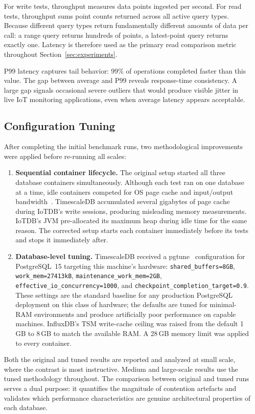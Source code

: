 For write tests, throughput measures data points ingested per second. For read tests,
throughput sums point counts returned across all active query types. Because different query
types return fundamentally different amounts of data per call: a range query returns
hundreds of points, a latest-point query returns exactly one. Latency is therefore
used as the primary read comparison metric throughout Section~\ref{sec:experiments}.

P99 latency captures tail behavior: 99\% of operations completed faster than this value.
The gap between average and P99 reveals response-time consistency. A large gap signals
occasional severe outliers that would produce visible jitter in live IoT monitoring applications,
even when average latency appears acceptable.

\subsection{Configuration Tuning}
\label{sec:tuning}

After completing the initial benchmark runs, two methodological improvements were applied
before re-running all scales:

\begin{enumerate}
  \item \textbf{Sequential container lifecycle.} The original setup started all three
    database containers simultaneously. Although each test ran on one database at a time, idle
    containers competed for OS page cache and input/output bandwidth~\citep{shapira2016pitfalls}. TimescaleDB accumulated several
    gigabytes of page cache during IoTDB's write sessions, producing misleading memory
    measurements. IoTDB's JVM pre-allocated its maximum heap during idle time for the same reason.
    The corrected setup starts each container immediately before its tests and stops it
    immediately after.

  \item \textbf{Database-level tuning.} TimescaleDB received a pgtune~\citep{pgtune}
    configuration for PostgreSQL~15 targeting this machine's hardware:
    \texttt{shared\_buffers=8GB}, \texttt{work\_mem=27413kB},
    \texttt{maintenance\_work\_mem=2GB}, \texttt{effective\_io\_concurrency=1000}, and
    \texttt{checkpoint\_completion\_target=0.9}. These settings are the standard baseline for
    any production PostgreSQL deployment on this class of hardware; the defaults are tuned
    for minimal-RAM environments and produce artificially poor performance on capable machines.
    InfluxDB's TSM write-cache ceiling was raised from the default 1\,GB to 8\,GB to match the
    available RAM. A 28\,GB memory limit was applied to every container.
\end{enumerate}

Both the original and tuned results are reported and analyzed at small scale, where the
contrast is most instructive. Medium and large-scale results use the tuned methodology
throughout. The comparison between original and tuned runs serves a dual purpose: it
quantifies the magnitude of contention artefacts and validates which performance
characteristics are genuine architectural properties of each database.
